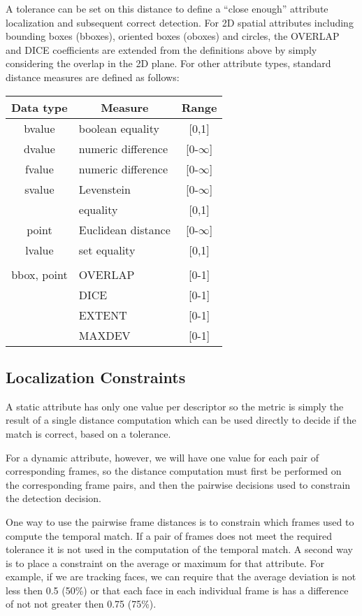 A tolerance can be set on this distance to define a ``close enough''
attribute localization and subsequent correct detection.  For 2D
spatial attributes including bounding boxes (bboxes), oriented boxes
(oboxes) and circles, the OVERLAP and DICE coefficients are extended
from the definitions above by simply considering the overlap in the 2D
plane.  For other attribute types, standard distance measures are
defined as follows:

\begin{center}
\begin{tabular}{c|l|c}
Data type &\multicolumn{1}{c}{Measure} & Range\\ \hline
 bvalue & boolean equality & [0,1]  \\
 dvalue & numeric difference & [0-$\infty$]\\
 fvalue & numeric difference & [0-$\infty$]\\
 svalue & Levenstein & [0-$\infty$]\\
        & equality & [0,1]\\
 point & Euclidean distance & [0-$\infty$] \\
 lvalue & set equality & [0,1]\\
 & & \\
bbox, point & OVERLAP & [0-1]\\
            & DICE & [0-1]\\
	   & EXTENT & [0-1] \\
	   & MAXDEV & [0-1] \\
\end{tabular}
\end{center}

\subsection{Localization Constraints}

A static attribute has only one value per descriptor so the metric is
simply the result of a single distance computation which can be used
directly to decide if the match is correct, based on a tolerance.  

For a dynamic attribute, however, we will have one value for each pair
of corresponding frames, so the distance computation must first be
performed on the corresponding frame pairs, and then the pairwise
decisions used to constrain the detection decision.  

One way to use the pairwise frame distances is to constrain which
frames used to compute the temporal match.  If a pair of frames does
not meet the required tolerance it is not used in the computation of
the temporal match.  A second way is to place a constraint on the
average or maximum for that attribute.  For example, if we are
tracking faces, we can require that the average deviation is not less then
0.5 (50\%) or that  each face in each individual frame is has a difference of not not greater then 0.75 (75\%).

